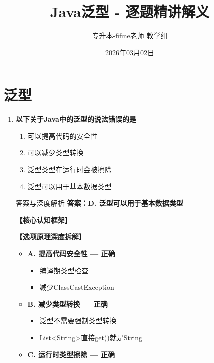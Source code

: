 \documentclass[12pt, a4paper]{ctexart}
\title{\textcolor{myblue}{\textbf{Java泛型 - 逐题精讲解义}}}
\author{专升本-fifine老师 教学组}
\date{2026年03月02日}
\begin{document}
\maketitle
\thispagestyle{empty}
\newpage

\section{泛型}

\begin{enumerate}[label=\textbf{\arabic*.}]

	\item \textbf{以下关于Java中的泛型的说法错误的是}
	      \begin{enumerate}[label=\Alph*.]
		      \item 可以提高代码的安全性
		      \item 可以减少类型转换
		      \item 泛型类型在运行时会被擦除
		      \item 泛型可以用于基本数据类型
	      \end{enumerate}

	      \begin{bluebox}{答案与深度解析}
		      \textbf{答案：D. 泛型可以用于基本数据类型}

		      \textbf{【核心认知框架】}

		      \textbf{【选项原理深度拆解】}
					  \begin{itemize}[label={}, leftmargin=*, nosep]


		      \item \textbf{A. 提高代码安全性 — 正确}
					  \begin{itemize}[label={}, nosep]
		      
			      \item 编译期类型检查
			      \item 减少ClassCastException
		      

					  \end{itemize}
		      \item \textbf{B. 减少类型转换 — 正确}
					  \begin{itemize}[label={}, nosep]
		      
			      \item 泛型不需要强制类型转换
			      \item List<String>直接get()就是String
		      

					  \end{itemize}
		      \item \textbf{C. 运行时类型擦除 — 正确}
					  \begin{itemize}[label={}, nosep]
		      

\end{itemize}
\end{itemize}
\end{bluebox}
\end{enumerate}
\end{document}
